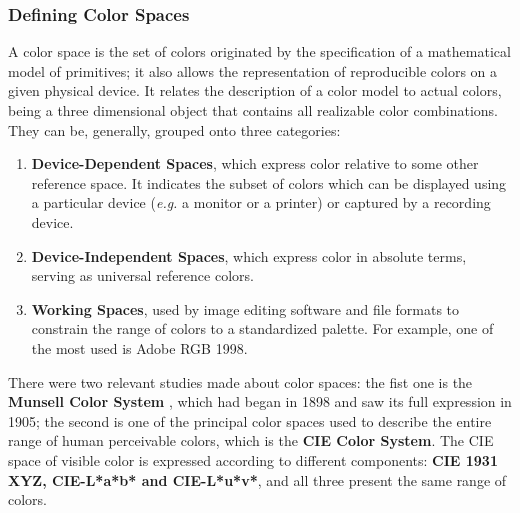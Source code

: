 \subsubsection{Defining Color Spaces}			%
%
A color space is the set of colors originated by the specification of a mathematical model of primitives; it also
allows the representation of reproducible colors on a given physical device. It relates the description
of a color model to actual colors, being a three dimensional object that contains all realizable color
combinations. They can be, generally, grouped onto three categories:
%
\begin{enumerate}
	\setlength\itemsep{0.01em}
	\item \textbf{Device-Dependent Spaces}, which express color relative to some other reference space. It
	  indicates the subset of colors which can be displayed using a particular device (\emph{e.g.} a monitor or a
	  printer) or captured by a recording device.
	\item \textbf{Device-Independent Spaces}, which express color in absolute terms, serving as universal
	  reference colors.
	\item \textbf{Working Spaces}, used by image editing software and file formats to constrain the range of
  	colors to a standardized palette. For example, one of the most used is Adobe RGB 1998.
\end{enumerate} \par
%
There were two relevant studies made about color spaces: the fist one is the \textbf{Munsell Color System} \cite{Munsell1919},
which had began in 1898 and saw its full expression in 1905; the second is one of the principal color spaces used to describe the
entire range of human perceivable colors, which is the \textbf{CIE Color System}. The CIE space of visible color is expressed
according to different components: \textbf{CIE 1931 XYZ, CIE-L*a*b* and CIE-L*u*v*}, and all three present the same range of colors.
%
